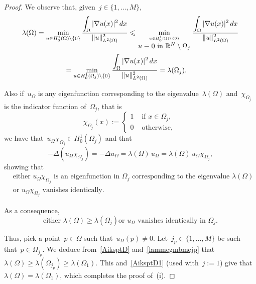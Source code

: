 \documentclass[10pt,a4paper]{amsart}
\def \R {\mathbb{R}}
\renewcommand{\ge}{\geqslant}
\renewcommand{\le}{\leqslant}
\begin{document}
\begin{proof} 
We observe that, given~$j\in\{1,\dots,M\}$,
\begin{equation}\label{AiksptD1}\begin{split}
& \lambda(\Omega)=\min_{u\in H^1_0(\Omega)\setminus\{0\}}\frac{\displaystyle\int_\Omega|\nabla u(x)|^2\,dx}{\|u\|^2_{L^2(\Omega)}}
\le\min_{{u\in H^1_0(\Omega)\setminus\{0\}}\atop{\tiny{\mbox{$u\equiv0$ in~$\R^N\setminus\Omega_j$}}}}
\frac{\displaystyle\int_\Omega|\nabla u(x)|^2\,dx}{\|u\|^2_{L^2(\Omega)}}\\&\qquad\qquad\qquad=
\min_{u\in H^1_0(\Omega_j)\setminus\{0\}}\frac{\displaystyle\int_\Omega|\nabla u(x)|^2\,dx}{\|u\|^2_{L^2(\Omega)}}
=\lambda(\Omega_j).
\end{split}\end{equation}

Also
if~$u_\Omega$ is any eigenfunction corresponding to the eigenvalue~$\lambda(\Omega)$
and~$\chi_{\Omega_j}$ is the indicator function of~$\Omega_j$,
that is
$$ \chi_{\Omega_j}(x):=\begin{cases}1&{\mbox{ if }}x\in\Omega_j,\\
0&{\mbox{ otherwise, }}\end{cases}$$
we have that~$u_\Omega\chi_{\Omega_j}\in H^1_0(\Omega_j)$ and that
$$-\Delta(u_\Omega\chi_{\Omega_j})=-\Delta u_\Omega=\lambda(\Omega)\,u_\Omega
=\lambda(\Omega)\,u_\Omega\chi_{\Omega_j},$$
showing that \begin{equation}\label{AB7}\begin{split}&{\mbox{either~$u_\Omega\chi_{\Omega_j}$ is an eigenfunction in~$\Omega_j$ corresponding to
the eigenvalue~$\lambda(\Omega)$}}\\&{\mbox{or~$u_\Omega\chi_{\Omega_j}$ vanishes identically.}}\end{split}\end{equation}

As a consequence, 
\begin{equation}\label{AiksptD}
{\mbox{either~$\lambda(\Omega)\ge\lambda(\Omega_j)$
or~$u_\Omega$ vanishes identically in~$\Omega_j$.}}\end{equation}

Thus, pick a point~$p\in\Omega$ such that~$u_\Omega(p)\ne0$.
Let~$j_p\in\{1,\dots,M\}$ be such that~$p\in\Omega_{j_p}$. We deduce from~\eqref{AiksptD}
and~\eqref{lammegmbmejp}
that~$\lambda(\Omega)\ge\lambda(\Omega_{j_p})\ge\lambda(\Omega_1)$.
This and~\eqref{AiksptD1} (used with~$j:=1$) give that~$\lambda(\Omega)=\lambda(\Omega_1)$,
which completes the proof of~(i).


\end{proof}
\end{document}

